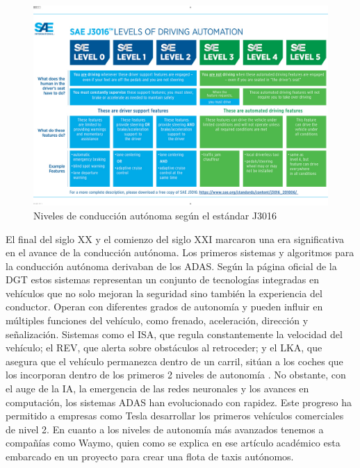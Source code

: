 \newpage

\begin{figure}[h] 
    \centering
    \includegraphics[width=1\linewidth]{imagenes/cap1/niveles_conduccion_autonoma.jpg} 
    \caption{Niveles de conducción autónoma según el estándar J3016}
    \label{fig:Niveles de conducción autónoma según el estándar J3016} 
\end{figure}

\bigskip

El final del siglo XX y el comienzo del siglo XXI marcaron una era significativa en el avance de la conducción autónoma. Los primeros sistemas y algoritmos para la conducción autónoma derivaban de los \ac{ADAS}. Según la página oficial de la DGT \cite{ADAS_DGT} estos sistemas representan un conjunto de tecnologías integradas en vehículos que no solo mejoran la seguridad sino también la experiencia del conductor. Operan con diferentes grados de autonomía y pueden influir en múltiples funciones del vehículo, como frenado, aceleración, dirección y señalización. Sistemas como el \ac{ISA}, que regula constantemente la velocidad del vehículo; el \ac{REV}, que alerta sobre obstáculos al retroceder; y el \ac{LKA}, que asegura que el vehículo permanezca dentro de un carril, sitúan a los coches que los incorporan dentro de los primeros 2 niveles de autonomía \cite{articulo-academico-tesla}. No obstante, con el auge de la \ac{IA}, la emergencia de las redes neuronales y los avances en computación, los sistemas \ac{ADAS} han evolucionado con rapidez. Este progreso ha permitido a empresas como Tesla desarrollar los primeros vehículos comerciales de nivel 2. En cuanto a los niveles de autonomía más avanzados tenemos a compañías como Waymo, quien como se explica en ese artículo académico \cite{tesla_y_robotaxi} esta embarcado en un proyecto para crear una flota de taxis autónomos.

